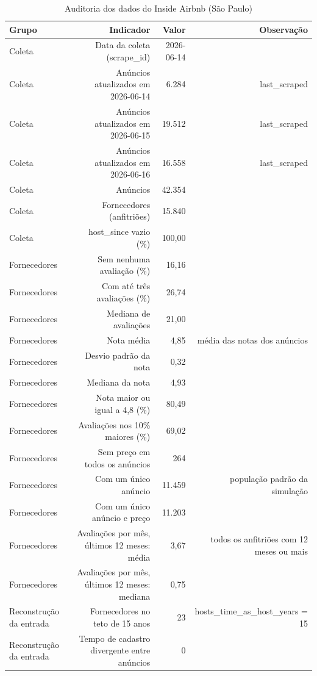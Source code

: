 \begin{table}[ht]
\centering
\caption{Auditoria dos dados do Inside Airbnb (São Paulo)}
\label{tab:auditoria}
\begin{tabular}{lrrr}
\hline
\textbf{Grupo} & \textbf{Indicador} & \textbf{Valor} & \textbf{Observação} \\
\hline
Coleta & Data da coleta (scrape\_id) & 2026-06-14 &  \\
Coleta & Anúncios atualizados em 2026-06-14 & 6.284 & last\_scraped \\
Coleta & Anúncios atualizados em 2026-06-15 & 19.512 & last\_scraped \\
Coleta & Anúncios atualizados em 2026-06-16 & 16.558 & last\_scraped \\
Coleta & Anúncios & 42.354 &  \\
Coleta & Fornecedores (anfitriões) & 15.840 &  \\
Coleta & host\_since vazio (\%) & 100,00 &  \\
Fornecedores & Sem nenhuma avaliação (\%) & 16,16 &  \\
Fornecedores & Com até três avaliações (\%) & 26,74 &  \\
Fornecedores & Mediana de avaliações & 21,00 &  \\
Fornecedores & Nota média & 4,85 & média das notas dos anúncios \\
Fornecedores & Desvio padrão da nota & 0,32 &  \\
Fornecedores & Mediana da nota & 4,93 &  \\
Fornecedores & Nota maior ou igual a 4,8 (\%) & 80,49 &  \\
Fornecedores & Avaliações nos 10\% maiores (\%) & 69,02 &  \\
Fornecedores & Sem preço em todos os anúncios & 264 &  \\
Fornecedores & Com um único anúncio & 11.459 & população padrão da simulação \\
Fornecedores & Com um único anúncio e preço & 11.203 &  \\
Fornecedores & Avaliações por mês, últimos 12 meses: média & 3,67 & todos os anfitriões com 12 meses ou mais \\
Fornecedores & Avaliações por mês, últimos 12 meses: mediana & 0,75 &  \\
Reconstrução da entrada & Fornecedores no teto de 15 anos & 23 & hosts\_time\_as\_host\_years = 15 \\
Reconstrução da entrada & Tempo de cadastro divergente entre anúncios & 0 &  \\

\end{tabular}
\end{table}
